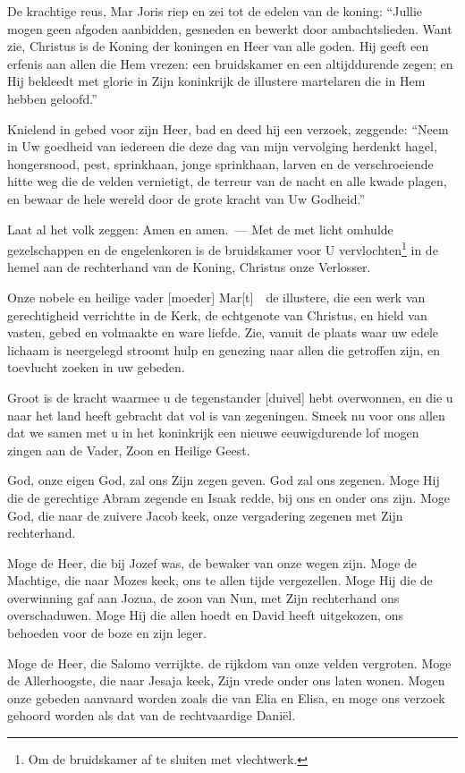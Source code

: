 \documentclass[12pt,twoside,a5paper]{article}
\begin{document}
\begin{halfparskip}
  De krachtige reus, Mar Joris riep en zei tot de edelen van de koning: ``Jullie mogen geen afgoden aanbidden, gesneden en bewerkt door ambachtslieden. Want zie, Christus is de Koning der koningen en Heer van alle goden. Hij geeft een erfenis aan allen die Hem vrezen: een bruidskamer en een altijddurende zegen; en Hij bekleedt met glorie in Zijn koninkrijk de illustere martelaren die in Hem hebben geloofd.''

  Knielend in gebed voor zijn Heer, bad en deed hij een verzoek, zeggende: ``Neem in Uw goedheid van iedereen die deze dag van mijn vervolging herdenkt hagel, hongersnood, pest, sprinkhaan, jonge sprinkhaan, larven en de verschroeiende hitte weg die de velden vernietigt, de terreur van de nacht en alle kwade plagen, en bewaar de hele wereld door de grote kracht van Uw Godheid.''

  Laat al het volk zeggen: Amen en amen.~--- Met de met licht omhulde gezelschappen en de engelenkoren is de bruidskamer voor U vervlochten\footnote{Om de bruidskamer af te sluiten met vlechtwerk.} in de hemel aan de rechterhand van de Koning, Christus onze Verlosser.

  Onze nobele en heilige vader [moeder] Mar[t]~\NN\ de illustere, die een werk van gerechtigheid verrichtte in de Kerk, de echtgenote van Christus, en hield van vasten, gebed en volmaakte en ware liefde. Zie, vanuit de plaats waar uw edele lichaam is neergelegd stroomt hulp en genezing naar allen die getroffen zijn, en toevlucht zoeken in uw gebeden.

  Groot is de kracht waarmee u de tegenstander [duivel] hebt overwonnen, en die u naar het land heeft gebracht dat vol is van zegeningen. Smeek nu voor ons allen dat we samen met u in het koninkrijk een nieuwe eeuwigdurende lof mogen zingen aan de Vader, Zoon en Heilige Geest.

  God, onze eigen God, zal ons Zijn zegen geven. God zal ons zegenen. Moge Hij die de gerechtige Abram zegende en Isaak redde, bij ons en onder ons zijn. Moge God, die naar de zuivere Jacob keek, onze vergadering zegenen met Zijn rechterhand.

  Moge de Heer, die bij Jozef was, de bewaker van onze wegen zijn. Moge de Machtige, die naar Mozes keek, ons te allen tijde vergezellen. Moge Hij die de overwinning gaf aan Jozua, de zoon van Nun, met Zijn rechterhand ons overschaduwen. Moge Hij die allen hoedt en David heeft uitgekozen, ons behoeden voor de boze en zijn leger.

  Moge de Heer, die Salomo verrijkte. de rijkdom van onze velden vergroten. Moge de Allerhoogste, die naar Jesaja keek, Zijn vrede onder ons laten wonen. Mogen onze gebeden aanvaard worden zoals die van Elia en Elisa, en moge ons verzoek gehoord worden als dat van de rechtvaardige Daniël.


\end{halfparskip}
\end{document}
